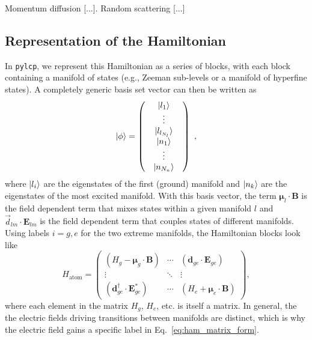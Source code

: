 \documentclass[final,5p,times,twocolumn]{elsarticle}
\begin{document}
Momentum diffusion [...]. Random scattering [...]

\subsection{Representation of the Hamiltonian}
In {\tt pylcp}, we represent this Hamiltonian as a series of blocks, with each block containing a manifold of states (e.g., Zeeman sub-levels or a manifold of hyperfine states). A completely generic basis set vector can then be written as
\begin{equation}
    \ket{\phi} = \left(\begin{array}{c} \begin{array}{c} \ket{l_1} \\ \vdots \\ \ket{l_{l_{N_l}}} \end{array} \\ \begin{array}{c} \ket{n_1} \\ \vdots \\ \ket{n_{N_n}} \end{array} \end{array}\right)\ ,
\end{equation}
where $\ket{l_i}$ are the eigenstates of the first (ground) manifold and $\ket{n_k}$ are
the eigenstates of the most excited manifold.  With this basis vector, the term $\boldsymbol{\mu}_l\cdot\mathbf{B}$ is the field dependent term that mixes states within a given manifold $l$ and $\vec{d}_{lm}\cdot\mathbf{E}_{lm}$ is the field dependent term that couples states of different manifolds.  Using labels $i=g,e$ for the two extreme manifolds, the Hamiltonian blocks look like
\begin{equation}
    \label{eq:ham_matrix_form}
    H_\text{atom} = \left(
    \begin{array}{ccc}
    (H_g - \boldsymbol{\mu}_g\cdot \mathbf{B}) & \cdots & (\boldsymbol{d}_{ge}\cdot\mathbf{E}_{ge}) \\
    \vdots & \ddots & \vdots  \\
    (\boldsymbol{d}_{ge}^\dagger\cdot\mathbf{E}_{ge}^*) & \cdots & (H_e+\boldsymbol{\mu}_e\cdot \mathbf{B})
    \end{array}\right),
\end{equation}
where each element in the matrix $H_g$, $H_e$, etc. is itself a matrix.  In general, the the electric fields driving transitions between manifolds are distinct, which is why the electric field gains a specific label in Eq.~\ref{eq:ham_matrix_form}.
\end{document}
